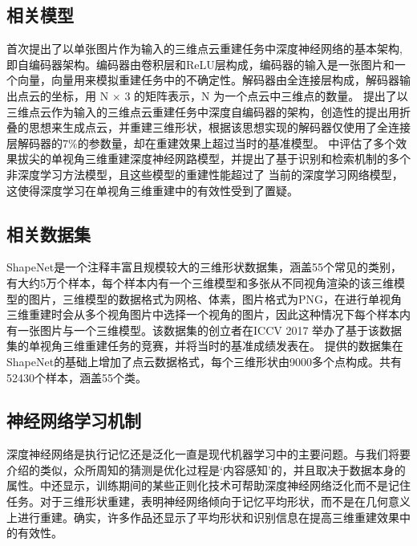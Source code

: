 \documentclass[bachelor, nocolorlinks, printoneside]{seuthesis} %
\begin{document}
\begin{Main}
\subsection{相关模型}
\cite{fan2017point}首次提出了以单张图片作为输入的三维点云重建任务中深度神经网络的基本架构, 即自编码器架构。编码器由卷积层和ReLU层构成，编码器的输入是一张图片和一个向量，向量用来模拟重建任务中的不确定性。解码器由全连接层构成，解码器输出点云的坐标，用 N × 3 的矩阵表示，N 为一个点云中三维点的数量。
\cite{yang2018foldingnet}提出了以三维点云作为输入的三维点云重建任务中深度自编码器的架构，创造性的提出用折叠的思想来生成点云，并重建三维形状，根据该思想实现的解码器仅使用了全连接层解码器的7\%的参数量，却在重建效果上超过当时的基准模型。
\cite{tatarchenko2019single}中评估了多个效果拔尖的单视角三维重建深度神经网路模型，并提出了基于识别和检索机制的多个非深度学习方法模型，且这些模型的重建性能超过了
当前的深度学习网络模型，这使得深度学习在单视角三维重建中的有效性受到了置疑。

\subsection{相关数据集}
ShapeNet\cite{chang2015shapenet}是一个注释丰富且规模较大的三维形状数据集，涵盖55个常见的类别，有大约5万个样本，每个样本内有一个三维模型和多张从不同视角渲染的该三维模型的图片，三维模型的数据格式为网格、体素，图片格式为PNG，在进行单视角三维重建时会从多个视角图片中选择一个视角的图片，因此这种情况下每个样本内有一张图片与一个三维模型。该数据集的创立者在ICCV 2017 举办了基于该数据集的单视角三维重建任务的竞赛，并将当时的基准成绩发表在\cite{Yi2017LargeScale3S}。
\cite{tatarchenko2019single}提供的数据集在ShapeNet\cite{chang2015shapenet}的基础上增加了点云数据格式，每个三维形状由9000多个点构成。共有52430个样本，涵盖55个类。
\subsection{神经网络学习机制}
深度神经网络是执行记忆还是泛化一直是现代机器学习中的主要问题。与我们将要介绍的类似，众所周知的猜测是优化过程是‘内容感知’的，并且取决于数据本身的属性\cite{arpit2017closer}。\cite{arpit2017closer}中还显示，训练期间的某些正则化技术可帮助深度神经网络泛化而不是记住任务。对于三维形状重建，\cite{tatarchenko2019single}表明神经网络倾向于记忆平均形状，而不是在几何意义上进行重建。确实，许多作品还显示了平均形状和识别信息在提高三维重建效果中的有效性\cite{kanazawa2018learning,pontes2018image2mesh,kurenkov2018deformnet}。


\end{Main}
\end{document}
